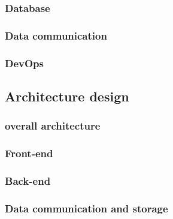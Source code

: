 \documentclass{article}
\begin{document}
            \subsubsection{Database}
            
            
            \subsubsection{Data communication}
            
            
            \subsubsection{DevOps}
            

    \subsection{Architecture design}

        
        \subsubsection{overall architecture}
        

        \subsubsection{Front-end}
        

        \subsubsection{Back-end}
        

        \subsubsection{Data communication and storage}
        
\end{document}
